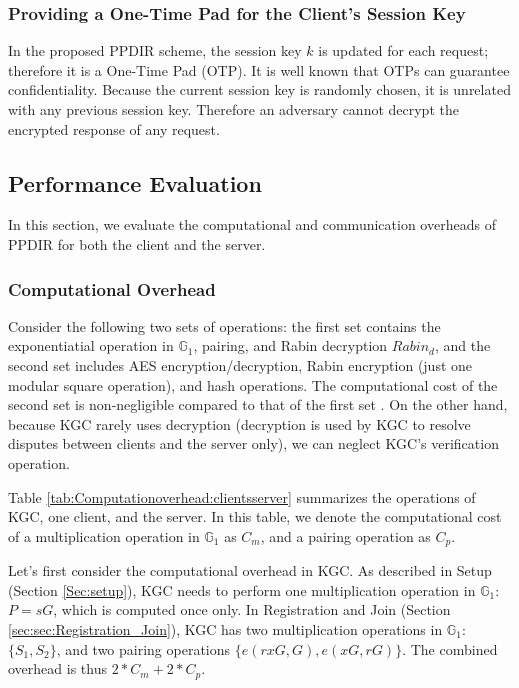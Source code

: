 \documentclass[letterpaper,12pt]{article}
\begin{document}
\subsubsection{Providing a One-Time Pad for the Client's Session Key}

In the proposed PPDIR scheme, the session key $k$ is updated for each request; therefore it is a One-Time Pad (OTP). It is well known that OTPs can guarantee confidentiality. Because the current session key is randomly chosen, it is unrelated with any previous session key. Therefore an adversary cannot decrypt the encrypted response of any request.

\subsection{Performance Evaluation}\label{sec:Performance_Evaluation}
In this section, we evaluate the computational and communication overheads of PPDIR for both the client and the server.

\subsubsection{Computational Overhead}

Consider the following two sets of operations: the first set contains the exponentiatial operation in $\mathbb{G}_1$, pairing, and Rabin decryption $Rabin_d$, and the second set includes AES encryption/decryption, Rabin encryption (just one modular square operation), and hash operations. The computational cost of the second set is non-negligible compared to that of the first set \cite{dai20095:Online}.  On the other hand, because KGC rarely uses decryption (decryption is used by KGC to resolve disputes between clients and the server only), we can neglect KGC's verification operation.

Table \ref{tab:Computationoverhead:clientsserver} summarizes the operations of KGC, one client, and the server. In this table,  we denote the computational cost of a multiplication operation in $\mathbb{G}_1$ as $C_m$, and a pairing operation as $C_p$.

Let's first consider the computational overhead in KGC. As described in Setup (Section \ref{Sec:setup}), KGC needs to perform one multiplication operation in $\mathbb{G}_1$: $P=sG$,  which is computed once only. In Registration and Join (Section \ref{sec:sec:Registration_Join}), KGC has two multiplication operations in $\mathbb{G}_1$: $\{S_1, S_2\}$, and two pairing operations $\{e(rxG, G), e(xG, rG)\}$. The combined overhead is thus $2\ast C_m+2\ast C_p$. %
\end{document}
